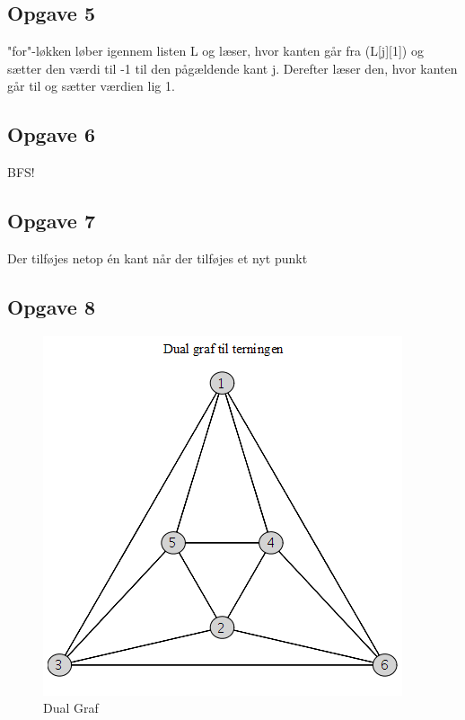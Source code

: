 \documentclass[../main.tex]{subfiles} %
\begin{document}
\subsection{Opgave 5}
"for"-løkken løber igennem listen L og læser, hvor kanten går fra (L[j][1]) og sætter den værdi til -1 til den pågældende kant j. Derefter læser den, hvor kanten går til og sætter værdien lig 1.

\subsection{Opgave 6}
BFS!
\subsection{Opgave 7}
Der tilføjes netop én kant når der tilføjes et nyt punkt
\subsection{Opgave 8}

    \begin{figure}[H]
		\centering
		\includegraphics[width=0.5\linewidth]{images/opg8DualGraf.png}
		\caption[]{Dual Graf}
		\label{fig:opg8DualGraf}
    \end{figure}
\end{document}
